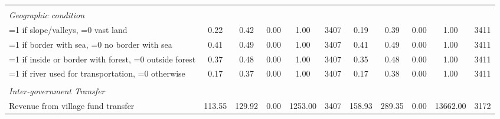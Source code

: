 \begin{tabular}{l*{2}{ccccc}}
\vspace{0.05em} \\ \emph{Geographic condition}&         &         &         &         &         &         &         &         &         &         \\
\hspace{0.25cm} =1 if slope/valleys, =0 vast land&     0.22&     0.42&     0.00&     1.00&     3407&     0.19&     0.39&     0.00&     1.00&     3411\\
\hspace{0.25cm} =1 if border with sea, =0 no border with sea&     0.41&     0.49&     0.00&     1.00&     3407&     0.41&     0.49&     0.00&     1.00&     3411\\
\hspace{0.25cm} =1 if inside or border with forest, =0 outside forest&     0.37&     0.48&     0.00&     1.00&     3407&     0.35&     0.48&     0.00&     1.00&     3411\\
\hspace{0.25cm} =1 if river used for transportation, =0 otherwise&     0.17&     0.37&     0.00&     1.00&     3407&     0.17&     0.38&     0.00&     1.00&     3411\\
\vspace{0.05em} \\ \emph{Inter-government Transfer}&         &         &         &         &         &         &         &         &         &         \\
\hspace{0.25cm} Revenue from village fund transfer&   113.55&   129.92&     0.00&  1253.00&     3407&   158.93&   289.35&     0.00& 13662.00&     3172\\
\bottomrule
\end{tabular}

